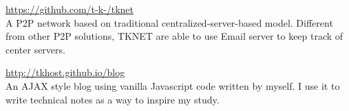 \documentclass[]{deedy-resume-openfont}
\begin{document}
\begin{minipage}[t]{0.66\textwidth}
\href{https://github.com/t-k-/tknet}{https://github.com/t-k-/tknet} \\
\vspace{\topsep} %
A P2P network based on traditional centralized-server-based model. Different from other P2P solutions, TKNET are able to use Email server to keep track of center servers. \\
\sectionsep


\href{http://tkhost.github.io/blog}{http://tkhost.github.io/blog} \\
\vspace{\topsep} %
An AJAX style blog using vanilla Javascript code written by myself. I use it to write technical notes as a way to inspire my study.
\sectionsep

\end{minipage} 
\end{document}
